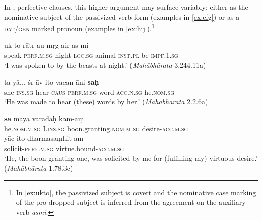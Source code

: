 \documentclass[output=paper,
modfonts
]{LSP/langsci}
\begin{document}
In , perfective clauses, this higher argument may  surface variably: either as the nominative subject of the passivized verb form (examples in \cref{ex:efg})  or as a \textsc{dat/gen} marked  pronoun (examples in \cref{ex:hij}).\footnote{In \cref{ex:ukto}, the passivized subject is covert and the nominative case marking of the pro-dropped subject  is inferred from the agreement on  the auxiliary verb \textit{asmi}.}
  
\begin{exe}
\ex\label{ex:efg}
\begin{xlist}
\ex\label{ex:ukto}\gll uk-to rātr-au mṛg-air as-mi \\
	speak-\textsc{perf.m.sg} night-\textsc{loc.sg} animal-\textsc{inst.pl} be-\textsc{impf.1.sg} \\
	\glt `I was spoken to by the beasts at night.' (\textit{Mahābhārata}  3.244.11a)
	
\ex\label{ex:taya}\gll ta-yā...  śr-āv-ito vacan-āni \textbf{saḥ} \\  
she-\textsc{ins.sg} hear-\textsc{caus-perf.m.sg} word-\textsc{acc.n.sg} he.\textsc{nom.sg} \\
\glt `He was made to hear (these) words by her.' (\textit{Mahābhārata}  2.2.6a)

\ex\label{ex:sa}\gll \textbf{sa} mayā varadaḥ  kām-aṃ \\
he.\textsc{nom.m.sg} I.\textsc{ins.sg} boon.granting.\textsc{nom.m.sg} desire-\textsc{acc.m.sg} \\

\gll yāc-ito dharmasaṃhit-am \\ 
solicit-\textsc{perf.m.sg} virtue.bound-\textsc{acc.m.sg} \\
\glt `He, the boon-granting one, was solicited by me for (fulfilling my) virtuous desire.' (\textit{Mahābhārata} 1.78.3c)
\end{xlist}
\end{exe}
\end{document}
